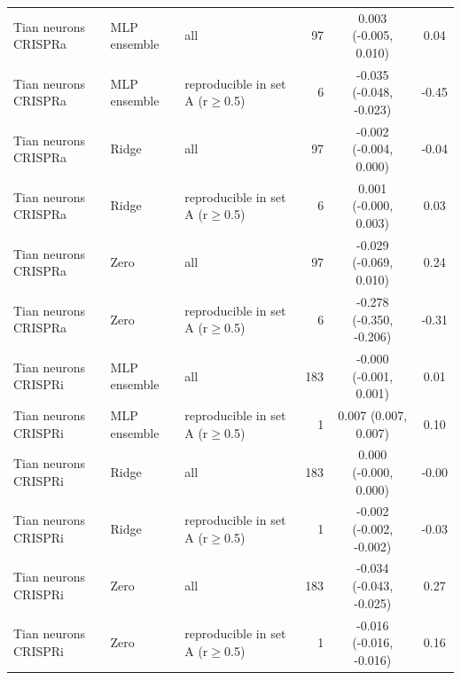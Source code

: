 \begin{tabular}{lllrcc}
Tian neurons CRISPRa & MLP ensemble & all & 97 & 0.003 (-0.005, 0.010) & 0.04 \\
Tian neurons CRISPRa & MLP ensemble & reproducible in set A (r$\ge$0.5) & 6 & -0.035 (-0.048, -0.023) & -0.45 \\
Tian neurons CRISPRa & Ridge & all & 97 & -0.002 (-0.004, 0.000) & -0.04 \\
Tian neurons CRISPRa & Ridge & reproducible in set A (r$\ge$0.5) & 6 & 0.001 (-0.000, 0.003) & 0.03 \\
Tian neurons CRISPRa & Zero & all & 97 & -0.029 (-0.069, 0.010) & 0.24 \\
Tian neurons CRISPRa & Zero & reproducible in set A (r$\ge$0.5) & 6 & -0.278 (-0.350, -0.206) & -0.31 \\
Tian neurons CRISPRi & MLP ensemble & all & 183 & -0.000 (-0.001, 0.001) & 0.01 \\
Tian neurons CRISPRi & MLP ensemble & reproducible in set A (r$\ge$0.5) & 1 & 0.007 (0.007, 0.007) & 0.10 \\
Tian neurons CRISPRi & Ridge & all & 183 & 0.000 (-0.000, 0.000) & -0.00 \\
Tian neurons CRISPRi & Ridge & reproducible in set A (r$\ge$0.5) & 1 & -0.002 (-0.002, -0.002) & -0.03 \\
Tian neurons CRISPRi & Zero & all & 183 & -0.034 (-0.043, -0.025) & 0.27 \\
Tian neurons CRISPRi & Zero & reproducible in set A (r$\ge$0.5) & 1 & -0.016 (-0.016, -0.016) & 0.16 \\
\bottomrule
\end{tabular}